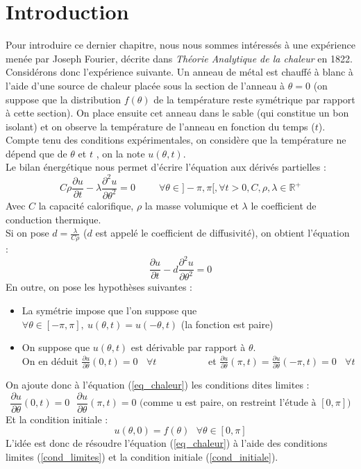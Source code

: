 \documentclass[a4paper,10pt]{report}
\begin{document}
\section{Introduction}
Pour introduire ce dernier chapitre, nous nous sommes intéressés à une expérience menée par Joseph Fourier, décrite dans \textit{Théorie Analytique de la chaleur} en 1822. \\
\indent Considérons donc l'expérience suivante. Un anneau de métal est chauffé à blanc à l'aide d'une source de chaleur placée sous la section de l'anneau à $\theta=0$ (on suppose que la distribution $f(\theta)$ de la température reste symétrique par rapport à cette section). On place ensuite cet anneau dans le sable (qui constitue un bon isolant) et on observe la température de l'anneau en fonction du temps ($t$). Compte tenu des conditions expérimentales, on considère que la température ne dépend que de $\theta$ et $t$ , on la note $u(\theta,t)$. \\
\indent Le bilan énergétique nous permet d'écrire l'équation aux dérivés partielles :
\abovedisplayskip=0mm
\begin{displaymath}
\textit{C}\rho \frac{\partial u}{\partial t} - \lambda \frac{\partial^2u}{\partial\theta^2} = 0 \ \ \ \ \ \ \ \ \ \ \ \forall \theta \in ]-\pi , \pi [, \forall t>0, C, \rho, \lambda \in \mathbb{R}^+
\end{displaymath}
Avec $\textit{C}$ la capacité calorifique, $\rho$ la masse volumique et $\lambda$ le coefficient de conduction thermique.\\
Si on pose $d=\frac{\lambda}{\textit{C}\rho}$ ($d$ est appelé le coefficient de diffusivité), on obtient l'équation :
\begin{equation}
\label{eq_chaleur}
\frac{\partial u}{\partial t} - d \frac{\partial^2 u}{\partial \theta^2} = 0
\end{equation}
En outre, on pose les hypothèses suivantes :
\begin{itemize}
\item La symétrie impose que l'on suppose que $\forall \theta \in [-\pi,\pi], \ u(\theta,t)=u(-\theta,t)$ (la fonction est paire)
\item On suppose que $u(\theta,t)$ est dérivable par rapport à $\theta$. \\
On en déduit $\frac{\partial u}{\partial \theta}(0,t)=0 \ \ \ \ \forall t$
\ \ \ \ \ \ \ \ \ \ et $\frac{\partial u}{\partial \theta}(\pi,t)=\frac{\partial u}{\partial \theta}(-\pi,t)=0 \ \ \ \ \forall t$
\end{itemize}
On ajoute donc à l'équation (\ref{eq_chaleur}) les conditions dites limites :
\begin{equation}
\label{cond_limites}
\frac{\partial u}{\partial \theta}(0,t)=0 \ \ \ \frac{\partial u}{\partial \theta}(\pi,t)=0 \text{ (comme u est paire, on restreint l'étude à }[0,\pi])
\end{equation}
Et la condition initiale :
\begin{equation}
\label{cond_initiale}
u(\theta,0)=f(\theta) \ \ \ \forall \theta \in [0,\pi]
\end{equation}
L'idée est donc de résoudre l'équation (\ref{eq_chaleur}) à l'aide des conditions limites (\ref{cond_limites}) et la condition initiale (\ref{cond_initiale}).
\end{document}
